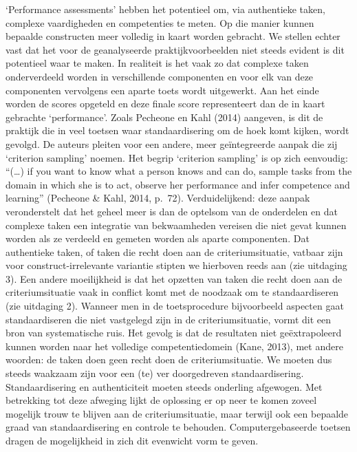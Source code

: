 \documentclass[
  letterpaper,
]{report}
\begin{document}
`Performance assessments' hebben het potentieel om, via authentieke
taken, complexe vaardigheden en competenties te meten. Op die manier
kunnen bepaalde constructen meer volledig in kaart worden gebracht. We
stellen echter vast dat het voor de geanalyseerde praktijkvoorbeelden
niet steeds evident is dit potentieel waar te maken. In realiteit is het
vaak zo dat complexe taken onderverdeeld worden in verschillende
componenten en voor elk van deze componenten vervolgens een aparte toets
wordt uitgewerkt. Aan het einde worden de scores opgeteld en deze finale
score representeert dan de in kaart gebrachte `performance'. Zoals
Pecheone en Kahl (2014) aangeven, is dit de praktijk die in veel toetsen
waar standaardisering om de hoek komt kijken, wordt gevolgd. De auteurs
pleiten voor een andere, meer geïntegreerde aanpak die zij `criterion
sampling' noemen. Het begrip `criterion sampling' is op zich eenvoudig:
``(\ldots) if you want to know what a person knows and can do, sample
tasks from the domain in which she is to act, observe her performance
and infer competence and learning'' (Pecheone \& Kahl, 2014, p.~72).
Verduidelijkend: deze aanpak veronderstelt dat het geheel meer is dan de
optelsom van de onderdelen en dat complexe taken een integratie van
bekwaamheden vereisen die niet gevat kunnen worden als ze verdeeld en
gemeten worden als aparte componenten. Dat authentieke taken, of taken
die recht doen aan de criteriumsituatie, vatbaar zijn voor
construct-irrelevante variantie stipten we hierboven reeds aan (zie
uitdaging 3). Een andere moeilijkheid is dat het opzetten van taken die
recht doen aan de criteriumsituatie vaak in conflict komt met de
noodzaak om te standaardiseren (zie uitdaging 2). Wanneer men in de
toetsprocedure bijvoorbeeld aspecten gaat standaardiseren die niet
vastgelegd zijn in de criteriumsituatie, vormt dit een bron van
systematische ruis. Het gevolg is dat de resultaten niet geëxtrapoleerd
kunnen worden naar het volledige competentiedomein (Kane, 2013), met
andere woorden: de taken doen geen recht doen de criteriumsituatie. We
moeten dus steeds waakzaam zijn voor een (te) ver doorgedreven
standaardisering. Standaardisering en authenticiteit moeten steeds
onderling afgewogen. Met betrekking tot deze afweging lijkt de oplossing
er op neer te komen zoveel mogelijk trouw te blijven aan de
criteriumsituatie, maar terwijl ook een bepaalde graad van
standaardisering en controle te behouden. Computergebaseerde toetsen
dragen de mogelijkheid in zich dit evenwicht vorm te geven.
\end{document}
